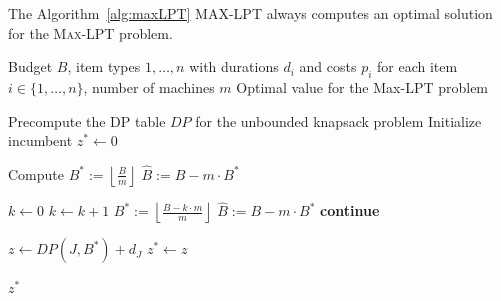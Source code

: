\begin{theorem}
The Algorithm~\ref{alg:maxLPT} MAX-LPT always computes an optimal solution for the \textsc{Max-LPT} problem.
\end{theorem}

\begin{algorithm}[H]
\caption{\textsc{Max-LPT}}
\label{alg:maxLPT}
\begin{algorithmic}[1]
\Require Budget $B$, item types $1, \ldots, n$ with durations $d_i$ and costs $p_i$ for each item $i \in \{1, \ldots, n\}$, number of machines $m$
\Ensure Optimal value for the Max-LPT problem

\State Precompute the DP table $DP$ for the unbounded knapsack problem
\State Initialize incumbent $z^* \gets 0$

    \State Compute $B^* := \left\lfloor \frac{B}{m} \right\rfloor$ 
    \State $\hat{B} := B - m \cdot B^*$
    
        \State $k \gets 0$
            \State $k \gets k + 1$
            \State $B^* := \left\lfloor \frac{B - k \cdot m}{m} \right\rfloor$
            \State $\hat{B} := B - m \cdot B^*$
        \EndWhile
            \State \textbf{continue} 
        \EndIf
    \EndIf
    
    \State $z \gets DP(J, B^*) + d_J$
        \State $z^* \gets z$
    \EndIf
\EndFor

\State \Return $z^*$
\end{algorithmic}
\end{algorithm}


